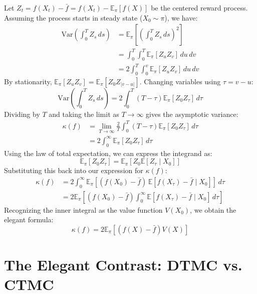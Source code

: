 \documentclass[11pt]{article}
\begin{document}
Let $Z_t = f(X_t) - \bar{f} = f(X_t) - \mathbb{E}_\pi[f(X)]$ be the centered reward process. Assuming the process starts in steady state ($X_0 \sim \pi$), we have:
\begin{align}
    \text{Var}\left( \int_0^T Z_s \, ds \right) &= \mathbb{E}_\pi\left[ \left( \int_0^T Z_s \, ds \right)^2 \right] \nonumber \\
    &= \int_0^T \int_0^T \mathbb{E}_\pi [ Z_u Z_v ] \, du \, dv \nonumber \\
    &= 2 \int_0^T \int_0^v \mathbb{E}_\pi [ Z_u Z_v ] \, du \, dv
\end{align}
By stationarity, $\mathbb{E}_\pi [ Z_u Z_v ] = \mathbb{E}_\pi [ Z_0 Z_{\lvert v-u \rvert} ]$. Changing variables using $\tau = v-u$:
\begin{equation}
    \text{Var}\left( \int_0^T Z_s \, ds \right) = 2 \int_0^T (T - \tau) \mathbb{E}_\pi [ Z_0 Z_\tau ] \, d\tau
\end{equation}
Dividing by $T$ and taking the limit as $T \to \infty$ gives the asymptotic variance:
\begin{align}
    \kappa(f) &= \lim_{T \to \infty} \frac{2}{T} \int_0^T (T - \tau) \mathbb{E}_\pi [ Z_0 Z_\tau ] \, d\tau \nonumber \\
    &= 2 \int_0^\infty \mathbb{E}_\pi [ Z_0 Z_\tau ] \, d\tau
\end{align}
Using the law of total expectation, we can express the integrand as:
\begin{equation}
    \mathbb{E}_\pi [ Z_0 Z_\tau ] = \mathbb{E}_\pi \left[ Z_0 \mathbb{E}[ Z_\tau \mid X_0 ] \right]
\end{equation}
Substituting this back into our expression for $\kappa(f)$:
\begin{align}
    \kappa(f) &= 2 \int_0^\infty \mathbb{E}_\pi \left[ (f(X_0) - \bar{f}) \, \mathbb{E}[ f(X_\tau) - \bar{f} \mid X_0 ] \right] \, d\tau \nonumber \\
    &= 2 \mathbb{E}_\pi \left[ (f(X_0) - \bar{f}) \int_0^\infty \mathbb{E}[ f(X_\tau) - \bar{f} \mid X_0 ] \, d\tau \right]
\end{align}
Recognizing the inner integral as the value function $V(X_0)$, we obtain the elegant formula:
\begin{equation}
    \kappa(f) = 2 \mathbb{E}_\pi \left[ (f(X) - \bar{f}) V(X) \right]
\end{equation}

\section{The Elegant Contrast: DTMC vs. CTMC}
\end{document}
